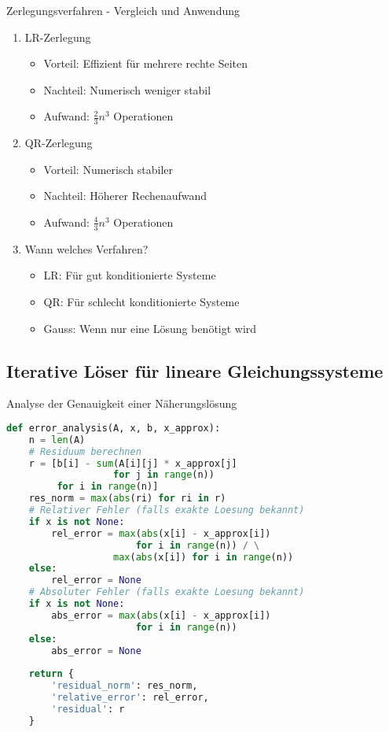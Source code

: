 \begin{KR}{Zerlegungsverfahren - Vergleich und Anwendung}
\begin{enumerate}
    \item LR-Zerlegung
    \begin{itemize}
        \item Vorteil: Effizient für mehrere rechte Seiten
        \item Nachteil: Numerisch weniger stabil
        \item Aufwand: $\frac{2}{3}n^3$ Operationen
    \end{itemize}
    
    \item QR-Zerlegung
    \begin{itemize}
        \item Vorteil: Numerisch stabiler
        \item Nachteil: Höherer Rechenaufwand
        \item Aufwand: $\frac{4}{3}n^3$ Operationen
    \end{itemize}
    
    \item Wann welches Verfahren?
    \begin{itemize}
        \item LR: Für gut konditionierte Systeme
        \item QR: Für schlecht konditionierte Systeme
        \item Gauss: Wenn nur eine Lösung benötigt wird
    \end{itemize}
\end{enumerate}
\end{KR}

\subsection{Iterative Löser für lineare Gleichungssysteme}

\begin{examplecode}{Analyse der Genauigkeit einer Näherungslösung}
\begin{lstlisting}[language=Python, style=basesmol]
def error_analysis(A, x, b, x_approx):
    n = len(A)
    # Residuum berechnen
    r = [b[i] - sum(A[i][j] * x_approx[j] 
                   for j in range(n)) 
         for i in range(n)]
    res_norm = max(abs(ri) for ri in r)
    # Relativer Fehler (falls exakte Loesung bekannt)
    if x is not None:
        rel_error = max(abs(x[i] - x_approx[i]) 
                       for i in range(n)) / \
                   max(abs(x[i]) for i in range(n))
    else:
        rel_error = None
    # Absoluter Fehler (falls exakte Loesung bekannt)
    if x is not None:
        abs_error = max(abs(x[i] - x_approx[i]) 
                       for i in range(n))
    else:
        abs_error = None
    
    return {
        'residual_norm': res_norm,
        'relative_error': rel_error,
        'residual': r
    }
\end{lstlisting}
\end{examplecode}

